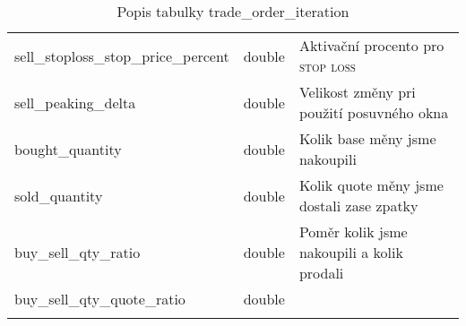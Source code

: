 \begin{center}
\begin{longtable}[t]{|l|C{4cm}|p{4cm}|}
        sell\_stoploss\_stop\_price\_percent & double                                                                                                                                                                                                               & Aktivační procento pro  \textsc{stop loss}                                                                                        \\
        sell\_peaking\_delta                 & double                                                                                                                                                                                                               & Velikost změny pri použití posuvného okna                                                                                         \\
        bought\_quantity                     & double                                                                                                                                                                                                               & Kolik base měny jsme nakoupili                                                                                                    \\
        sold\_quantity                       & double                                                                                                                                                                                                               & Kolik quote měny jsme dostali zase zpatky                                                                                         \\
        buy\_sell\_qty\_ratio                & double                                                                                                                                                                                                               & Poměr kolik jsme nakoupili a kolik prodali                                                                                        \\
        buy\_sell\_qty\_quote\_ratio         & double                                                                                                                                                                                                               &                                                                                                                                   \\
        \hline
        \caption*{Popis tabulky trade\_order\_iteration}
        \label{tab:tradeOrderIteration}
    \end{longtable}
\end{center}

